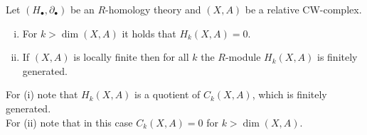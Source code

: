 	\begin{corollary}
		Let $(H_\bullet, \partial_\bullet)$ be an $R$-homology theory and $(X,A)$ be a relative CW-complex.
		\begin{enumerate}[(i)]
			\item{
				For $k>\dim(X,A)$ it holds that $H_k(X,A) =0$.
			}
			\item{
				If $(X,A)$ is locally finite then for all $k$ the $R$-module $H_k(X,A)$ is finitely generated.
			}
		\end{enumerate}
	\end{corollary}
	\begin{sketch}
		For (i) note that $H_k(X,A)$ is a quotient of $C_k(X,A)$, which is finitely generated.\\
		For (ii) note that in this case $C_k(X,A) = 0$ for $k > \dim(X,A)$.
	\end{sketch}

